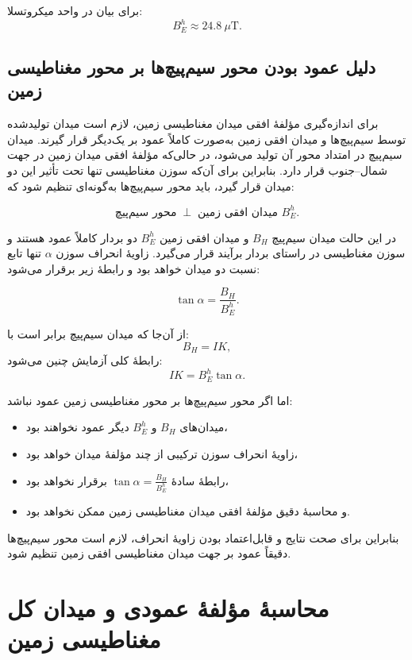 \documentclass[a4paper, 11pt]{article}
\begin{document}
برای بیان در واحد میکروتسلا:
\begin{equation}
B_E^{h} \approx 24.8\ \mu\mathrm{T}.
\end{equation}

\subsection{دلیل عمود بودن محور سیم‌پیچ‌ها بر محور مغناطیسی زمین}

برای اندازه‌گیری مؤلفهٔ افقی میدان مغناطیسی زمین، لازم است میدان تولیدشده توسط سیم‌پیچ‌ها و میدان افقی زمین به‌صورت کاملاً عمود بر یک‌دیگر قرار گیرند. میدان سیم‌پیچ در امتداد محور آن تولید می‌شود، در حالی‌که مؤلفهٔ افقی میدان زمین در جهت شمال–جنوب قرار دارد. بنابراین برای آن‌که سوزن مغناطیسی تنها تحت تأثیر این دو میدان قرار گیرد، باید محور سیم‌پیچ‌ها به‌گونه‌ای تنظیم شود که:

\[
\text{محور سیم‌پیچ} \;\perp\; \text{میدان افقی زمین } B_E^h.
\]

در این حالت میدان سیم‌پیچ \(B_H\) و میدان افقی زمین \(B_E^h\) دو بردار کاملاً عمود هستند و سوزن مغناطیسی در راستای بردار برآیند قرار می‌گیرد. زاویهٔ انحراف سوزن \(\alpha\) تنها تابع نسبت دو میدان خواهد بود و رابطهٔ زیر برقرار می‌شود:

\[
\tan \alpha = \frac{B_H}{B_E^h}.
\]

از آن‌جا که میدان سیم‌پیچ برابر است با:
\[
B_H = IK,
\]
رابطهٔ کلی آزمایش چنین می‌شود:
\[
IK = B_E^h \tan \alpha.
\]

اما اگر محور سیم‌پیچ‌ها بر محور مغناطیسی زمین عمود نباشد:
\begin{itemize}
    \item میدان‌های \(B_H\) و \(B_E^h\) دیگر عمود نخواهند بود،
    \item زاویهٔ انحراف سوزن ترکیبی از چند مؤلفهٔ میدان خواهد بود،
    \item رابطهٔ سادهٔ \(\tan\alpha = \frac{B_H}{B_E^h}\) برقرار نخواهد بود،
    \item و محاسبهٔ دقیق مؤلفهٔ افقی میدان مغناطیسی زمین ممکن نخواهد بود.
\end{itemize}

بنابراین برای صحت نتایج و قابل‌اعتماد بودن زاویهٔ انحراف، لازم است محور سیم‌پیچ‌ها دقیقاً عمود بر جهت میدان مغناطیسی افقی زمین تنظیم شود.




\section{محاسبهٔ مؤلفهٔ عمودی و میدان کل مغناطیسی زمین}
\end{document}
